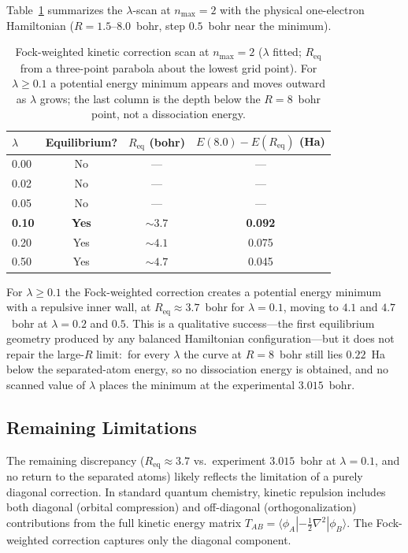 \documentclass[aps,pra,twocolumn,superscriptaddress,longbibliography]{revtex4-2}
\begin{document}
Table~\ref{tab:fock_scan} summarizes the $\lambda$-scan at
$n_{\max}=2$ with the physical one-electron Hamiltonian
($R = 1.5$--$8.0$~bohr, step $0.5$~bohr near the minimum).

\begin{table}[h]
\centering
\begin{tabular}{lccc}
\toprule
$\lambda$ & Equilibrium? & $R_{\mathrm{eq}}$ (bohr) &
$E(8.0)-E(R_{\mathrm{eq}})$ (Ha) \\
\midrule
0.00 & No & --- & --- \\
0.02 & No & --- & --- \\
0.05 & No & --- & --- \\
\textbf{0.10} & \textbf{Yes} & $\bm{\sim 3.7}$ & \textbf{0.092} \\
0.20 & Yes & $\sim 4.1$ & 0.075 \\
0.50 & Yes & $\sim 4.7$ & 0.045 \\
\bottomrule
\end{tabular}
\caption{Fock-weighted kinetic correction scan at $n_{\max}=2$
($\lambda$ fitted; $R_{\mathrm{eq}}$ from a three-point parabola about
the lowest grid point).  For $\lambda \geq 0.1$ a potential energy
minimum appears and moves outward as $\lambda$ grows; the last column
is the depth below the $R=8$~bohr point, not a dissociation energy.}
\label{tab:fock_scan}
\end{table}

For $\lambda \geq 0.1$ the Fock-weighted correction creates a potential
energy minimum with a repulsive inner wall, at
$R_{\mathrm{eq}} \approx 3.7$~bohr for $\lambda = 0.1$, moving to
$4.1$ and $4.7$~bohr at $\lambda = 0.2$ and $0.5$.  This is a
qualitative success---the first equilibrium geometry produced by any
balanced Hamiltonian configuration---but it does not repair the large-$R$
limit:\ for every $\lambda$ the curve at $R=8$~bohr still lies
$0.22$~Ha below the separated-atom energy, so no dissociation energy is
obtained, and no scanned value of $\lambda$ places the minimum at the
experimental $3.015$~bohr.

\subsection{Remaining Limitations}
\label{sec:limitations}

The remaining discrepancy ($R_{\mathrm{eq}} \approx 3.7$ vs.\
experiment $3.015$~bohr at $\lambda=0.1$, and no return to the
separated atoms) likely reflects the
limitation of a purely diagonal correction.  In standard quantum
chemistry, kinetic repulsion includes both diagonal (orbital compression)
and off-diagonal (orthogonalization) contributions from the full kinetic
energy matrix $T_{AB} = \langle\phi_A|-\tfrac{1}{2}\nabla^2|\phi_B\rangle$.
The Fock-weighted correction captures only the diagonal component.
\end{document}
